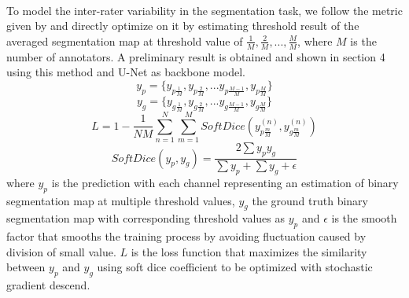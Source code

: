 \documentclass[12pt]{extarticle}
\begin{document}
\paragraph{}
To model the inter-rater variability in the segmentation task, 
we follow the metric given by \cite{qubiq} and directly 
optimize on it by estimating threshold result of the averaged segmentation map 
at threshold value of $\frac{1}{M}, \frac{2}{M}, ..., \frac{M}{M}$, 
where $M$ is the number of annotators. A preliminary result is obtained and 
shown in section 4 using this method and U-Net as backbone model.
\begin{equation}
    y_{p} = \{y_{p\frac{1}{M}}, y_{p\frac{2}{M}}, ... y_{p\frac{M-1}{M}},y_{p\frac{M}{M}}\}
\end{equation}
\begin{equation}
    y_{g} = \{y_{g\frac{1}{M}}, y_{g\frac{2}{M}}, ... y_{g\frac{M-1}{M}},y_{g\frac{M}{M}}\}
\end{equation}
\begin{equation}
    L = 1 - \frac{1}{NM}\sum_{n=1}^{N}\sum_{m=1}^{M}SoftDice(y_{p\frac{m}{M}}^{(n)}, y_{g\frac{m}{M}}^{(n)})
\end{equation}
\begin{equation}
    SoftDice(y_p, y_g) = \frac{2\sum y_p y_g}{\sum y_p +  \sum y_g + \epsilon}
\end{equation}
where $y_p$ is the prediction with each
channel representing an estimation of binary segmentation map at multiple threshold values, 
$y_g$ the ground truth binary segmentation map with corresponding threshold 
values as $y_p$ and $\epsilon$ is the smooth factor that smooths 
the training process by avoiding fluctuation caused by division of small value.
$L$ is the loss function that maximizes the similarity 
between $y_p$ and $y_g$ using soft dice coefficient 
to be optimized with stochastic gradient descend. 
\end{document}
